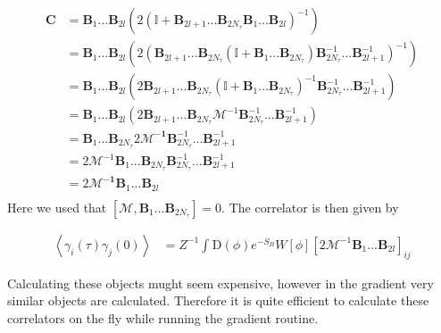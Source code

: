 \documentclass{article}
\begin{document}
\begin{align}
	\boldsymbol{C} &= \boldsymbol{B}_{1}...\boldsymbol{B}_{2l}\left(2\left(\mathbb{I} + \boldsymbol{B}_{2l+1}...\boldsymbol{B}_{2N_{\tau} }\boldsymbol{B}_{1}...\boldsymbol{B}_{2l}  \right)^{-1}\right) \nonumber \\
	&=    \boldsymbol{B}_{1}...\boldsymbol{B}_{2l} \left(2 \left(\boldsymbol{B}_{2l+1}...\boldsymbol{B}_{2N_\tau}\left(\mathbb{I} + \boldsymbol{B}_{1}...\boldsymbol{B}_{2N_\tau} \right)\boldsymbol{B}_{2N_\tau}^{-1}...\boldsymbol{B}_{2l+1}^{-1}         \right)^{-1}\right) \nonumber \\
	&=    \boldsymbol{B}_{1}...\boldsymbol{B}_{2l} \left(2\boldsymbol{B}_{2l+1}...\boldsymbol{B}_{2N_\tau}\left(\mathbb{I} + \boldsymbol{B}_{1}...\boldsymbol{B}_{2N_\tau} \right)^{-1} \boldsymbol{B}_{2N_\tau}^{-1}...\boldsymbol{B}_{2l+1}^{-1}\right) \nonumber \\
	&= \boldsymbol{B}_{1}...\boldsymbol{B}_{2l} \left(2\boldsymbol{B}_{2l+1}...\boldsymbol{B}_{2N_\tau} \boldsymbol{\mathcal{M}} ^{-1}  \boldsymbol{B}_{2N_\tau}^{-1}...\boldsymbol{B}_{2l+1}^{-1} \right) \nonumber \\
	& = \boldsymbol{B}_{1}...\boldsymbol{B}_{2N_{\tau} }2\boldsymbol{\mathcal{M}^{-1}}\boldsymbol{B}_{2N_\tau}^{-1} ...\boldsymbol{B}_{2l+1}^{-1} \nonumber \\
	&= 2\boldsymbol{\mathcal{M}}^{-1}\boldsymbol{B}_{1}...\boldsymbol{B}_{2N_\tau} \boldsymbol{B}_{2N_\tau}^{-1} ...\boldsymbol{B}_{2l+1}^{-1} \nonumber \\
	&= 2\boldsymbol{\mathcal{M}^{-1}}\boldsymbol{B}_{1}...\boldsymbol{B}_{2l} \nonumber \\
\end{align}
Here we used that $\left[ \boldsymbol{\mathcal{M}}, \boldsymbol{B}_{1}...\boldsymbol{B}_{2N_\tau}   \right] = 0 $. The correlator is then given by

\begin{align}
	\left< \gamma_{i}(\tau) \gamma_j(0)\right> &= Z^{-1}\int_{ }^{ } \mathrm{D}\left(\phi\right)e^{-S_{B}} W\left[\phi\right] \left[2\boldsymbol{\mathcal{M}}^{-1} \boldsymbol{B}_{1}...\boldsymbol{B}_{2l}  \right]_{ij} 
\end{align}

Calculating these objects mught seem expensive, however in the gradient very similar objects are calculated. Therefore it is quite efficient to calculate these correlators on the fly while running the gradient routine.
\end{document}
